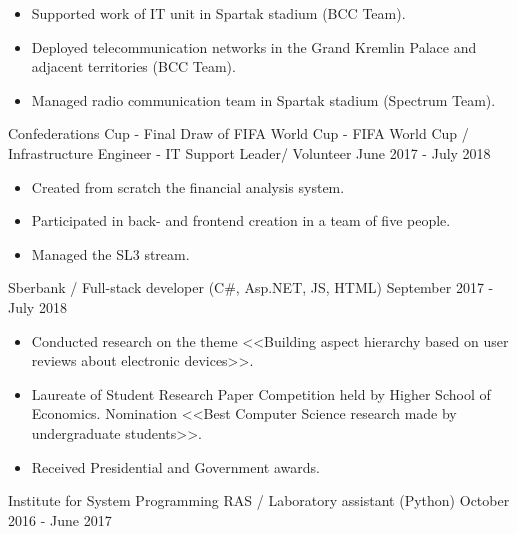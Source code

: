 \begin{cventries}
\vspace{-0.4cm}
\cventry
{
\vspace{-0.4cm}
\begin{itemize}
\item Supported work of IT unit in Spartak stadium (BCC Team).
\item Deployed telecommunication networks in the Grand Kremlin Palace and adjacent territories (BCC Team).
\item Managed radio communication team in Spartak stadium (Spectrum Team).
\end{itemize}
} %
{Confederations Cup - Final Draw of FIFA World Cup - FIFA World Cup / Infrastructure Engineer  - IT Support Leader/ Volunteer} %
{} %
{June 2017 - July 2018} %
\noindent	

\vspace{-0.4cm}
\cventry
{
\vspace{-0.4cm}
\begin{itemize}
\item Created from scratch the financial analysis system.
\item Participated in back- and frontend creation in a team of five people.
\item  Managed the SL3 stream.
\end{itemize}
} %
{Sberbank / Full-stack developer (C\#, Asp.NET, JS, HTML)} %
{} %
{September 2017 - July 2018} %
\noindent	


\vspace{-0.4cm}
\cventry
{
\vspace{-0.4cm}
\begin{itemize}
\item Conducted research on the theme <<Building aspect hierarchy based on user reviews about electronic devices>>.
\item Laureate of Student Research Paper Competition held by Higher School of Economics. Nomination <<Best Computer Science research made by undergraduate students>>.
\item Received Presidential and Government awards.
\end{itemize}
} %
{Institute for System Programming RAS / Laboratory assistant (Python)} %
{} %
{October 2016 - June 2017} %
\noindent	



\end{cventries}
